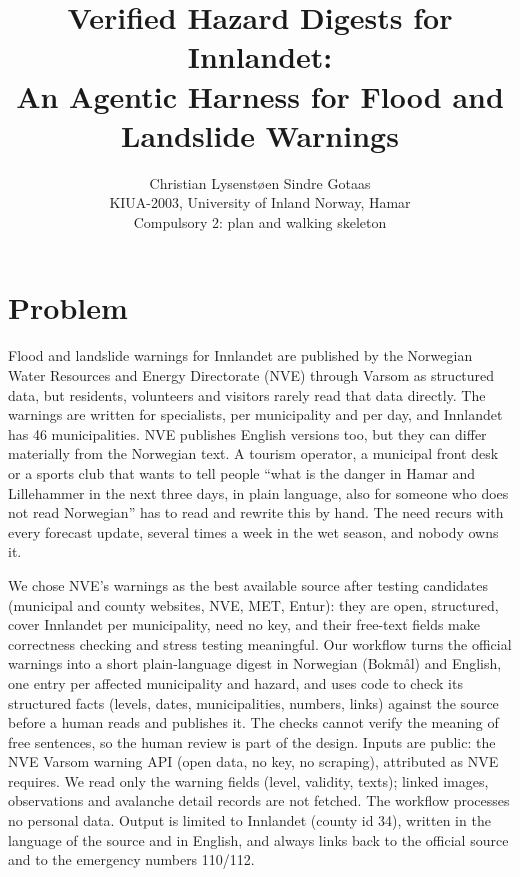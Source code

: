 \documentclass{article}
\title{Verified Hazard Digests for Innlandet:\\ An Agentic Harness for Flood and Landslide Warnings}
\author{%
  Christian Lysenstøen \quad Sindre Gotaas \\
  KIUA-2003, University of Inland Norway, Hamar \\
  Compulsory 2: plan and walking skeleton
}
\begin{document}
\maketitle

\section{Problem}
Flood and landslide warnings for Innlandet are published by the Norwegian Water Resources and Energy Directorate (NVE) through Varsom as structured data, but residents, volunteers and visitors rarely read that data directly. The warnings are written for specialists, per municipality and per day, and Innlandet has 46 municipalities. NVE publishes English versions too, but they can differ materially from the Norwegian text. A tourism operator, a municipal front desk or a sports club that wants to tell people ``what is the danger in Hamar and Lillehammer in the next three days, in plain language, also for someone who does not read Norwegian'' has to read and rewrite this by hand. The need recurs with every forecast update, several times a week in the wet season, and nobody owns it.

We chose NVE's warnings as the best available source after testing candidates (municipal and county websites, NVE, MET, Entur): they are open, structured, cover Innlandet per municipality, need no key, and their free-text fields make correctness checking and stress testing meaningful. Our workflow turns the official warnings into a short plain-language digest in Norwegian (Bokm{\aa}l) and English, one entry per affected municipality and hazard, and uses code to check its structured facts (levels, dates, municipalities, numbers, links) against the source before a human reads and publishes it. The checks cannot verify the meaning of free sentences, so the human review is part of the design. Inputs are public: the NVE Varsom warning API (open data, no key, no scraping), attributed as NVE requires. We read only the warning fields (level, validity, texts); linked images, observations and avalanche detail records are not fetched. The workflow processes no personal data. Output is limited to Innlandet (county id 34), written in the language of the source and in English, and always links back to the official source and to the emergency numbers 110/112.
\end{document}
